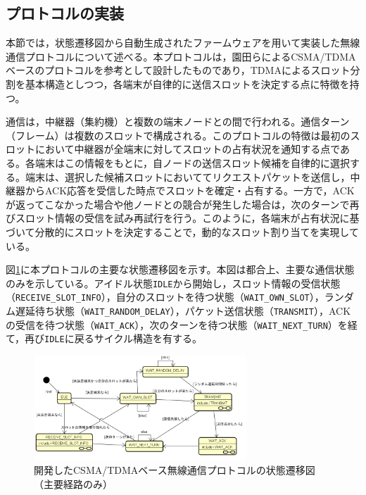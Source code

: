 \documentclass[technicalreport]{ieicej}
\begin{document}
\subsection{プロトコルの実装}
本節では，状態遷移図から自動生成されたファームウェアを用いて実装した無線通信プロトコルについて述べる。本プロトコルは，園田ら\cite{sonoda2021}によるCSMA/TDMAベースのプロトコルを参考として設計したものであり，TDMAによるスロット分割を基本構造としつつ，各端末が自律的に送信スロットを決定する点に特徴を持つ。

通信は，中継器（集約機）と複数の端末ノードとの間で行われる。通信ターン（フレーム）は複数のスロットで構成される。このプロトコルの特徴は最初のスロットにおいて中継器が全端末に対してスロットの占有状況を通知する点である。各端末はこの情報をもとに，自ノードの送信スロット候補を自律的に選択する。端末は、選択した候補スロットにおいててリクエストパケットを送信し，中継器からACK応答を受信した時点でスロットを確定・占有する。一方で，ACKが返ってこなかった場合や他ノードとの競合が発生した場合は，次のターンで再びスロット情報の受信を試み再試行を行う。このように，各端末が占有状況に基づいて分散的にスロットを決定することで，動的なスロット割り当てを実現している。 

図\ref{fig:protocol-state-machine}に本プロトコルの主要な状態遷移図を示す。本図は都合上、主要な通信状態のみを示している。アイドル状態\texttt{IDLE}から開始し，スロット情報の受信状態（\texttt{RECEIVE\_SLOT\_INFO}），自分のスロットを待つ状態（\texttt{WAIT\_OWN\_SLOT}），ランダム遅延待ち状態（\texttt{WAIT\_RANDOM\_DELAY}），パケット送信状態（\texttt{TRANSMIT}），ACKの受信を待つ状態（\texttt{WAIT\_ACK}），次のターンを待つ状態（\texttt{WAIT\_NEXT\_TURN}）を経て，再び\texttt{IDLE}に戻るサイクル構造を有する。

\begin{figure}[tb]
\centering
\includegraphics[width=80mm]{./images/protocol-state-machine3.png}
\caption{開発したCSMA/TDMAベース無線通信プロトコルの状態遷移図（主要経路のみ）}
\label{fig:protocol-state-machine}
\end{figure}
\end{document}
